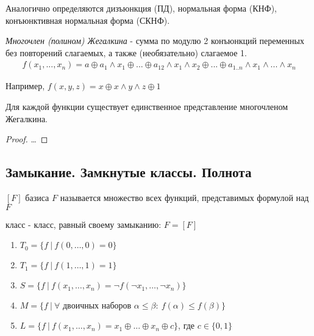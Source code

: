 \documentclass[a4paper, 14pt]{article}
\begin{document}
    Аналогично определяются { дизъюнкция} (ПД), { нормальная форма} (КНФ),
    { конъюнктивная нормальная форма} (СКНФ).

    \begin{definition}
        {\it Многочлен (полином) Жегалкина} - сумма по модулю 2 конъюнкций переменных
        без повторений слагаемых, а также (необязательно) слагаемое 1.
        \begin{align*}
            f(x_1, ..., x_n) = a \oplus a_1 \wedge x_1 \oplus ... \oplus 
            a_{12} \wedge x_1 \wedge x_2 
            \oplus ... \oplus a_{1..n} \wedge x_1 \wedge ... \wedge x_n
        \end{align*}
    \end{definition}

    Например, $f(x, y, z) = x \oplus x \wedge y \wedge z \oplus 1$ 

    \begin{theorem}
        Для каждой функции существует единственное представление многочленом Жегалкина.
    \end{theorem}
    \begin{proof}
        \dots
    \end{proof}
    
    \subsection*{Замыкание. Замкнутые классы. Полнота}
    
    \begin{definition}
        { $[F]$} базиса $F$ называется множество всех
        функций, представимых формулой над $F$
    \end{definition}
    \begin{definition}
        { класс} - класс, равный своему замыканию: $F = [F]$
    \end{definition}

    \begin{enumerate}
        \item $T_0 = \{f \ \vert \ f(0, \dots, 0) = 0\}$
        \item $T_1 = \{f \ \vert \ f(1, \dots, 1) = 1\}$
        \item $S = \{f \ \vert \ f(x_1, \dots, x_n) = \lnot f(\lnot x_1, \dots, \lnot x_n)\}$
        \item $M = \{f \ \vert \ \forall \text{ двоичных наборов } \alpha \leq \beta: \
        f(\alpha) \leq f(\beta)\}$
        \item $L = \{f \ \vert \ f(x_1, \dots, x_n) = x_1 \oplus ... \oplus x_n \oplus c\}$, где $c \in \{0, 1\}$
    \end{enumerate}
    
\end{document}
